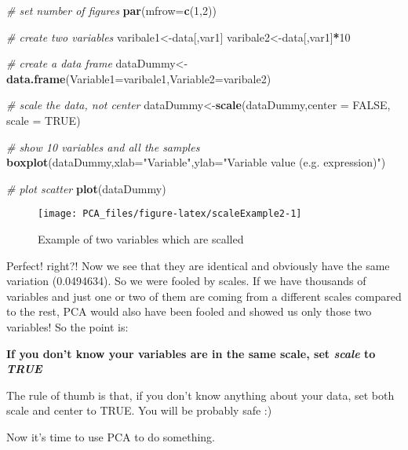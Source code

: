 \documentclass[
]{book}
\newenvironment{Shaded}{\begin{snugshade}}{\end{snugshade}}
\newcommand{\CommentTok}[1]{\textcolor[rgb]{0.56,0.35,0.01}{\textit{#1}}}
\newcommand{\DataTypeTok}[1]{\textcolor[rgb]{0.13,0.29,0.53}{#1}}
\newcommand{\DecValTok}[1]{\textcolor[rgb]{0.00,0.00,0.81}{#1}}
\newcommand{\KeywordTok}[1]{\textcolor[rgb]{0.13,0.29,0.53}{\textbf{#1}}}
\newcommand{\NormalTok}[1]{#1}
\newcommand{\OperatorTok}[1]{\textcolor[rgb]{0.81,0.36,0.00}{\textbf{#1}}}
\newcommand{\OtherTok}[1]{\textcolor[rgb]{0.56,0.35,0.01}{#1}}
\newcommand{\StringTok}[1]{\textcolor[rgb]{0.31,0.60,0.02}{#1}}
\theoremstyle{definition}
\theoremstyle{definition}
\theoremstyle{definition}
\theoremstyle{remark}
\begin{document}
\begin{Shaded}
\begin{Highlighting}[]
\CommentTok{# set number of figures}
\KeywordTok{par}\NormalTok{(}\DataTypeTok{mfrow=}\KeywordTok{c}\NormalTok{(}\DecValTok{1}\NormalTok{,}\DecValTok{2}\NormalTok{))}

\CommentTok{# create two variables}
\NormalTok{varibale1<-data[,var1]}
\NormalTok{varibale2<-data[,var1]}\OperatorTok{*}\DecValTok{10}

\CommentTok{# create a data frame}
\NormalTok{dataDummy<-}\KeywordTok{data.frame}\NormalTok{(}\DataTypeTok{Variable1=}\NormalTok{varibale1,}\DataTypeTok{Variable2=}\NormalTok{varibale2)}

\CommentTok{# scale the data, not center}
\NormalTok{dataDummy<-}\KeywordTok{scale}\NormalTok{(dataDummy,}\DataTypeTok{center =} \OtherTok{FALSE}\NormalTok{, }\DataTypeTok{scale =} \OtherTok{TRUE}\NormalTok{)}

\CommentTok{# show 10 variables and all the samples}
\KeywordTok{boxplot}\NormalTok{(dataDummy,}\DataTypeTok{xlab=}\StringTok{"Variable"}\NormalTok{,}\DataTypeTok{ylab=}\StringTok{"Variable value (e.g. expression)"}\NormalTok{)}

\CommentTok{# plot scatter}
\KeywordTok{plot}\NormalTok{(dataDummy)}
\end{Highlighting}
\end{Shaded}

\begin{figure}

{\centering \texttt{[image: PCA\_files/figure-latex/scaleExample2-1]} 

}

\caption{Example of two variables which are scalled}\label{fig:scaleExample2}
\end{figure}

Perfect! right?! Now we see that they are identical and obviously have the same variation (0.0494634). So we were fooled by scales. If we have thousands of variables and just one or two of them are coming from a different scales compared to the rest, PCA would also have been fooled and showed us only those two variables! So the point is:

\textbf{If you don't know your variables are in the same scale, set \emph{scale} to \emph{TRUE}}

The rule of thumb is that, if you don't know anything about your data, set both scale and center to TRUE. You will be probably safe :)

Now it's time to use PCA to do something.
\end{document}
